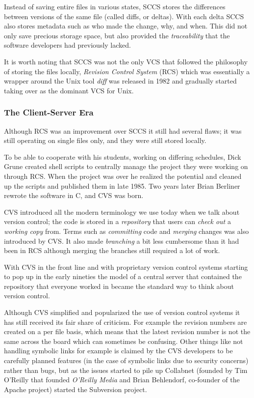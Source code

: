 \documentclass{article}
\begin{document}
Instead of saving entire files in various states, SCCS stores the
differences between versions of the same file (called diffs, or
deltas). With each delta SCCS also stores metadata such as who made
the change, why, and when. This did not only save precious storage
space, but also provided the \emph{traceability} that the software
developers had previously lacked.

It is worth noting that SCCS was not the only VCS that followed the
philosophy of storing the files locally, \emph{Revision Control
  System} (RCS) which was essentially a wrapper around the Unix tool
\emph{diff} was released in 1982 and gradually started taking over as
the dominant VCS for Unix.

\subsubsection{The Client-Server Era}
Although RCS was an improvement over SCCS it still had several flaws;
it was still operating on single files only, and they were still
stored locally. 

To be able to cooperate with his students, working on differing
schedules, Dick Grune created shell scripts to centrally manage the
project they were working on through RCS. When the project was over he
realized the potential and cleaned up the scripts and published them
in late 1985. Two years later Brian Berliner rewrote the software in
C, and CVS was born.

CVS introduced all the modern terminology we use today when we talk
about version control; the code is stored in a \emph{repository} that
users can \emph{check out} a \emph{working copy} from. Terms such as
\emph{committing} code and \emph{merging} changes was also introduced
by CVS. It also made \emph{branching} a bit less cumbersome than it
had been in RCS although merging the branches still required a lot of
work.

With CVS in the front line and with proprietary version control
systems starting to pop up in the early nineties the model of a
central server that contained the repository that everyone worked in
became the standard way to think about version control.

Although CVS simplified and popularized the use of version control
systems it has still received its fair share of criticism. For example
the revision numbers are created on a per file basis, which means that
the latest revision number is not the same across the board which can
sometimes be confusing. Other things like not handling symbolic links
for example is claimed by the CVS developers to be carefully planned
features (in the case of symbolic links due to security concerns)
rather than bugs, but as the issues started to pile up Collabnet
(founded by Tim O'Reilly that founded \emph{O'Reilly Media} and Brian
Behlendorf, co-founder of the Apache project) started the Subversion
project.
\end{document}
